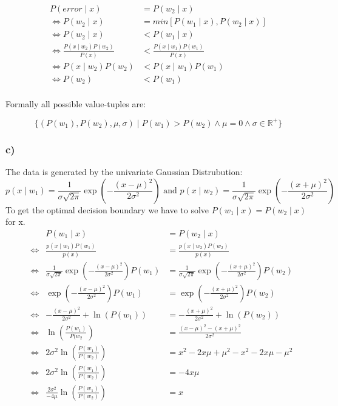 \documentclass[10pt,a4paper]{article}
\newcommand{\R}{\mathbb{R}}
\begin{document}
\begin{align*}
P(error \mid x) &= P(w_2 \mid x)\\
\Leftrightarrow P(w_2 \mid x) &= min[P(w_1 \mid x),P(w_2 \mid x)] \\
\Leftrightarrow P(w_2 \mid x) &< P(w_1 \mid x) \\
\Leftrightarrow \frac{P(x \mid w_2)P(w_2)}{P(x)} &< \frac{P(x \mid w_1)P(w_1)}{P(x)} \\
\Leftrightarrow P(x \mid w_2)P(w_2) &< P(x \mid w_1)P(w_1) \\
\Leftrightarrow P(w_2) &< P(w_1) \\
\end{align*}

Formally all possible value-tuples are:

$$\{ (P(w_1), P(w_2), \mu, \sigma) \mid P(w_1) > P(w_2) \land \mu = 0 \land \sigma \in \R^+ \}$$

\subsubsection*{c)}
The data is generated by the univariate Gaussian Distrubution:
$$p(x\mid w_1) = \frac{1}{\sigma\sqrt{2\pi}}\exp\left(-\frac{(x - \mu)^2}{2\sigma^2}\right) \textrm{ and } p(x\mid w_2) = \frac{1}{\sigma\sqrt{2\pi}}\exp\left(-\frac{(x + \mu)^2}{2\sigma^2}\right)$$
To get the optimal decision boundary we have to solve $P(w_1\mid x) = P(w_2 \mid x)$ for x.
\begin{align*}
&& P(w_1 \mid x) &= P(w_2 \mid x) \\
&\Leftrightarrow &\frac{p(x \mid w_1)P(w_1)}{p(x)} &= \frac{p(x \mid w_2)P(w_2)}{p(x)} \\
&\Leftrightarrow &\frac{1}{\sigma\sqrt{2\pi}}\exp\left(-\frac{(x - \mu)^2}{2\sigma^2}\right)P(w_1) &= \frac{1}{\sigma\sqrt{2\pi}}\exp\left(-\frac{(x + \mu)^2}{2\sigma^2}\right)P(w_2) \\
&\Leftrightarrow &\exp\left(-\frac{(x - \mu)^2}{2\sigma^2}\right)P(w_1) &= \exp\left(-\frac{(x + \mu)^2}{2\sigma^2}\right)P(w_2) \\
&\Leftrightarrow &-\frac{(x - \mu)^2}{2\sigma^2} + \ln\left(P(w_1)\right) &= -\frac{(x + \mu)^2}{2\sigma^2} + \ln\left(P(w_2)\right) \\
&\Leftrightarrow &\ln\left(\frac{P(w_1)}{P(w_2}\right) &= \frac{(x - \mu)^2 - (x + \mu)^2}{2\sigma^2}\\
&\Leftrightarrow &2\sigma^2\ln\left(\frac{P(w_1)}{P(w_2)}\right) &= x^2 - 2x\mu + \mu^2 - x^2 - 2x\mu - \mu^2 \\
&\Leftrightarrow &2\sigma^2\ln\left(\frac{P(w_1)}{P(w_2)}\right) &= -4x\mu \\
&\Leftrightarrow &\frac{2\sigma^2}{-4\mu}\ln\left(\frac{P(w_1)}{P(w_2)}\right) &= x
\end{align*}
\end{document}
